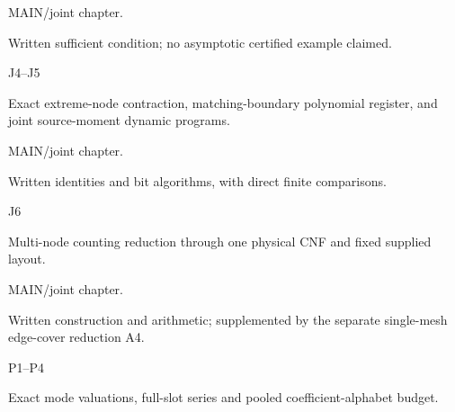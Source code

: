 \documentclass[11pt,a4paper]{article}
\newlength{\OfflineResearchTableWidth}
\newcommand{\OfflineResearchRow}{\par}
\newenvironment{OfflineResearchTable}{%
  \par\medskip\begingroup\small\setlength{\parindent}{0pt}%
  \setlength{\parskip}{3pt plus 1pt minus .5pt}%
  \setlength{\OfflineResearchTableWidth}{\linewidth}%
}{%
  \par\endgroup\medskip%
}
\begin{document}
\begin{OfflineResearchTable}
\begin{minipage}[t]{0.29295\OfflineResearchTableWidth}
MAIN/joint
chapter.
\end{minipage}\hfill%
\begin{minipage}[t]{0.31185\OfflineResearchTableWidth}\raggedright
Written sufficient condition; no asymptotic certified example
claimed.
\end{minipage}%
\OfflineResearchRow
\noindent%
\begin{minipage}[t]{0.06615\OfflineResearchTableWidth}\raggedright
J4--J5
\end{minipage}\hfill%
\begin{minipage}[t]{0.27405\OfflineResearchTableWidth}\raggedright
Exact extreme-node contraction, matching-boundary polynomial
register, and joint source-moment dynamic programs.
\end{minipage}\hfill%
\begin{minipage}[t]{0.29295\OfflineResearchTableWidth}\raggedright
MAIN/joint
chapter.
\end{minipage}\hfill%
\begin{minipage}[t]{0.31185\OfflineResearchTableWidth}\raggedright
Written identities and bit algorithms, with direct finite
comparisons.
\end{minipage}%
\OfflineResearchRow
\noindent%
\begin{minipage}[t]{0.06615\OfflineResearchTableWidth}\raggedright
J6
\end{minipage}\hfill%
\begin{minipage}[t]{0.27405\OfflineResearchTableWidth}\raggedright
Multi-node counting reduction through one physical CNF and fixed
supplied layout.
\end{minipage}\hfill%
\begin{minipage}[t]{0.29295\OfflineResearchTableWidth}\raggedright
MAIN/joint chapter.
\end{minipage}\hfill%
\begin{minipage}[t]{0.31185\OfflineResearchTableWidth}\raggedright
Written construction and
arithmetic; supplemented by the separate single-mesh edge-cover reduction A4.
\end{minipage}%
\OfflineResearchRow
\noindent%
\begin{minipage}[t]{0.06615\OfflineResearchTableWidth}\raggedright
P1--P4
\end{minipage}\hfill%
\begin{minipage}[t]{0.27405\OfflineResearchTableWidth}\raggedright
Exact mode valuations, full-slot series and pooled
coefficient-alphabet budget.
\end{minipage}\hfill%
\begin{minipage}[t]{0.29295\OfflineResearchTableWidth}\raggedright

\end{minipage}
\end{OfflineResearchTable}
\end{document}
